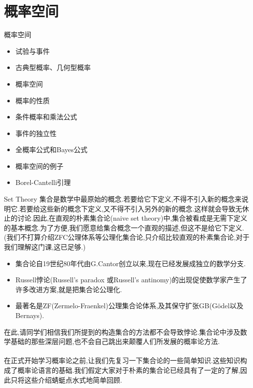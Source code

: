 \section{概率空间}

\frame{\sectionpage}

\begin{frame}{概率空间}
\begin{itemize}
	\item 试验与事件
	\item 古典型概率、几何型概率
	\item 概率空间
	\item 概率的性质
	\item 条件概率和乘法公式
	\item 事件的独立性
	\item 全概率公式和Bayes公式
	\item 概率空间的例子
	\item Borel-Cantelli引理
\end{itemize}
\end{frame}

\begin{frame}{Set Theory}
\alert{集合}是数学中最原始的概念.若要给它下定义,不得不引入新的概念来说明它.若要给这些新的概念下定义,又不得不引入另外的新的概念.这样就会导致无休止的讨论.因此,在直观的朴素集合论(naive set theory)中,集合被看成是无需下定义的基本概念.为了方便,我们愿意给集合概念一个直观的描述,但这不是给它下定义.(我们不打算介绍ZFC公理体系等公理化集合论,只介绍比较直观的朴素集合论,对于我们理解这门课,这已足够.)

\begin{itemize}
\item 集合论自19世纪80年代由G.Cantor创立以来,现在已经发展成独立的数学分支.
\item Russell悖论(Russell's paradox 或Russell's antinomy)的出现促使数学家产生了许多改进方案,就是把集合论公理化.

\item 最著名是ZF(Zermelo-Fraenkel)公理集合论体系,及其保守扩张GB(Gödel以及Bernays).
\end{itemize}
\end{frame}

\begin{frame}
\Large\alert{
在此,请同学们相信我们所提到的构造集合的方法都不会导致悖论.集合论中涉及数学基础的那些深层问题,也不会自己跳出来颠覆人们所发展的概率论方法.
}
\\ \hspace*{\fill} \\%
在正式开始学习概率论之前,让我们先复习一下集合论的一些简单知识.这些知识构成了概率论语言的基础.我们假定大家对于朴素的集合论已经具有了一定的了解,因此只将这些介绍蜻蜓点水式地简单回顾.
\end{frame}


